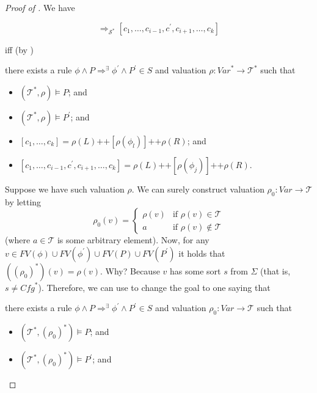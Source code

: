 \begin{proof}[Proof of ]
We have
\begin{proofenv}
\begin{equation*}
[c_1,\ldots,c_k] \Rightarrow_{\mathcal{S}^*} [c_1, \ldots, c_{i-1}, c^\prime, c_{i+1}, \ldots, c_k]    
\end{equation*}
\end{proofenv}
iff (by )
\begin{proofenv}
there exists a rule $\phi \land P \Rightarrow^\exists \phi^\prime \land P^\prime \in S$
and valuation $\rho : \mathit{Var}^* \to \mathcal{T}^*$ such that
\begin{itemize}
    \item $(\mathcal{T}^*, \rho) \vDash P$; and
    \item $(\mathcal{T}^*, \rho) \vDash P^\prime$; and
    \item $[c_1,\ldots,c_k] = \rho(L) \texttt{++} [\rho(\phi_l)] \texttt{++} \rho(R)$; and
    \item $[c_1, \ldots, c_{i-1}, c^\prime, c_{i+1}, \ldots, c_k] = \rho(L) \texttt{++} [\rho(\phi_j)] 
    \texttt{++} \rho(R)$.
\end{itemize}
\end{proofenv}
Suppose we have such valuation $\rho$.
We can surely construct valuation $\rho_0 : \mathit{Var} \to \mathcal{T}$ by letting
\begin{equation*}
\rho_0(v)=
    \begin{cases}
        \rho(v) & \text{if } \rho(v) \in \mathcal{T}\\
        a & \text{if } \rho(v) \not\in \mathcal{T}
    \end{cases}
\end{equation*}
(where $a \in \mathcal{T}$ is some arbitrary element).
Now, for any $v \in \mathit{FV}(\phi) \cup \mathit{FV}(\phi^\prime) \cup \mathit{FV}(P) \cup \mathit{FV}(P^\prime)$ it holds that
$((\rho_0)^*)(v) = \rho(v)$.
Why? Because $v$ has some sort $s$ from $\Sigma$
(that is, $s \not = \mathit{Cfg}^*$).
Therefore, we can use  to change the goal to one saying that
\begin{proofenv}
there exists a rule $\phi \land P \Rightarrow^\exists \phi^\prime \land P^\prime \in S$
and valuation $\rho_0 : \mathit{Var} \to \mathcal{T}$ such that
\begin{itemize}
    \item $(\mathcal{T}^*, (\rho_0)^*) \vDash P$; and
    \item $(\mathcal{T}^*, (\rho_0)^*) \vDash P^\prime$; and

\end{itemize}
\end{proofenv}
\end{proof}
